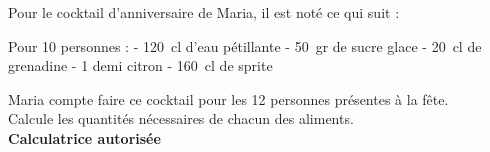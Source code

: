 %
%
	Pour le cocktail d’anniversaire de Maria, il est noté ce qui suit :

Pour 10 personnes :
-	\SI{120}{cl} d’eau pétillante
-	\SI{50}{gr} de sucre glace
-	\SI{20}{cl} de grenadine
-	1 demi citron
-	\SI{160}{cl} de sprite

Maria compte faire ce cocktail pour les 12 personnes présentes à la fête.\\  Calcule les quantités nécessaires de chacun des aliments.
\\ \textbf{Calculatrice autorisée}
